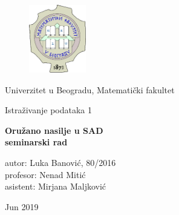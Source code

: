 \documentclass[
	12pt,			
	openright,		
	oneside,			
	a4paper,		
	english,			
	]{article}
\begin{document}
\begin{titlepage}


\vspace*{-1in}
\begin{figure}[htb]
\centering
\includegraphics[width=2.5cm]{Slike/logo.png}

\end{figure}
\begin{center}
\begin{large}    {Univerzitet u Beogradu, Matematički fakultet \\
    }
    \end{large}
    \vspace*{0.2in}
    \begin{large}    {Istraživanje podataka 1 
    }
    \end{large}

\end{center}

        \vspace*{1.8in}


        \begin{center}
            
       \vspace*{0.2in}
        \begin{huge}
        \textbf{Oružano nasilje u SAD \\
               seminarski rad}
        \\
        \end{huge}
        \vspace*{2in}
         \end{center}
        
        \begin{large}{\noindent
        autor: Luka Banović, 80/2016 
        \\   profesor: Nenad Mitić
        \\   asistent: Mirjana Maljković
        }
        \end{large}
        \vspace*{0.5in}
        
        \centering
        \begin{large}{
        Jun 2019}
        \end{large}
        
        
        \end{titlepage}
\end{document}
